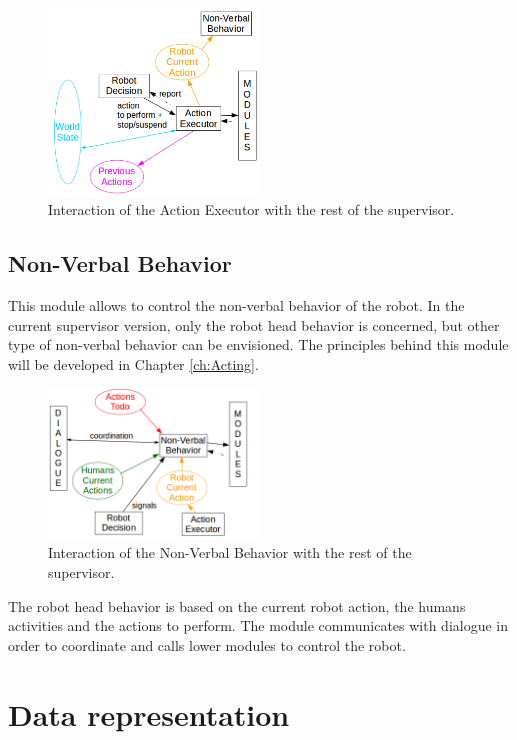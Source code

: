\documentclass[english,a4paper,11pt,twoside]{StyleThese}
\begin{document}
\begin{figure}[!h]
	\centering
    \includegraphics[width=0.5\textwidth]{figs/Chapter2/ActionExecutor.png}
    \caption{Interaction of the Action Executor with the rest of the supervisor.}
    \label{fig:actionExecutor}
\end{figure}

\subsection{Non-Verbal Behavior}

This module allows to control the non-verbal behavior of the robot. In the current supervisor version, only the robot head behavior is concerned, but other type of non-verbal behavior can be envisioned. The principles behind this module will be developed in Chapter \ref{ch:Acting}.

\begin{figure}[!h]
	\centering
    \includegraphics[width=0.5\textwidth]{figs/Chapter2/NVBehavior.png}
    \caption{Interaction of the Non-Verbal Behavior with the rest of the supervisor.}
    \label{fig:NVBehavior}
\end{figure}

The robot head behavior is based on the current robot action, the humans activities and the actions to perform. The module communicates with dialogue in order to coordinate and calls lower modules to control the robot. 

\section{Data representation}
\end{document}
